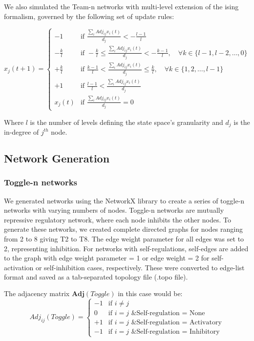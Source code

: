 \documentclass[11pt,a4paper]{article}
\theoremstyle{definition}
\theoremstyle{remark}
\begin{document}
We also simulated the Team-n networks with multi-level extension of the ising formalism, governed by the following set of update rules:

\begin{equation}
    x_j(t+1) =
    \begin{cases}
        -1 & \text{if } \frac{\sum_i Adj_{ij}x_i(t)}{d_j} < -\frac{l-1}{l} \\ 
        -\frac{k}{l} & \text{if } -\frac{k}{l} \leq \frac{\sum_i Adj_{ij}x_i(t)}{d_j} < -\frac{k-1}{l}, \quad \forall k \in \{l-1, l-2, \ldots, 0\} \\
        +\frac{k}{l} & \text{if } \frac{k-1}{l} < \frac{\sum_i Adj_{ij}x_i(t)}{d_j} \leq \frac{k}{l}, \quad \forall k \in \{1, 2, \ldots, l-1\} \\
        +1 & \text{if } \frac{l-1}{l} < \frac{\sum_i Adj_{ij}x_i(t)}{d_j} \\ 
        x_j(t) & \text{if } \frac{\sum_i Adj_{ij}x_i(t)}{d_j} = 0 
    \end{cases}
    \label{eq:multilevelMethods}
\end{equation}

Where $l$ is the number of levels defining the state space's granularity and $d_j$ is the in-degree of $j^{th}$ node.

\subsection{Network Generation}
\subsubsection{Toggle-n networks}
We generated networks using the NetworkX library \parencite{hagberg_exploring_2008} to create a series of toggle-n networks with varying numbers of nodes. Toggle-n networks are mutually repressive regulatory network, where each node inhibits the other nodes. To generate these networks, we created complete directed graphs for nodes ranging from 2 to 8 giving T2 to T8. The edge weight parameter for all edges was set to 2, representing inhibition. For networks with self-regulations, self-edges are added to the graph with edge weight parameter = 1 or edge weight = 2 for self-activation or self-inhibition cases, respectively. These were converted to edge-list format and saved as a tab-separated topology file (.topo file). 

The adjacency matrix $\mathbf{Adj}(Toggle)$ in this case would be:
\begin{equation}
    Adj_{ij}(Toggle) = \begin{cases}
      -1 & \text{if $i \neq j$}\\
      0 & \text{if $i = j$ \& Self-regulation = None}\\
      +1 & \text{if $i = j$ \& Self-regulation = Activatory}\\
      -1 & \text{if $i = j$ \& Self-regulation = Inhibitory}
    \end{cases}
    \label{toggle-adjmat-eq}
\end{equation}
\end{document}
